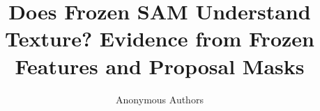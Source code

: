 \documentclass{article}
\title{Does Frozen SAM Understand Texture? Evidence from Frozen Features and Proposal Masks}
\author{Anonymous Authors}
\begin{document}
\maketitle












{\small


}

\clearpage
\appendix

\end{document}
